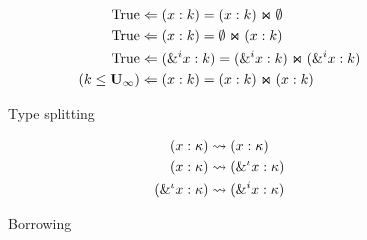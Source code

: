 \begin{figure*}[!h]
  \centering
  \begin{minipage}{0.45\linewidth}
    \begin{align*}
      \tsplit{\Ctrue&}{\bvar{x}{k}}{\bvar{x}{k}}{\Cempty}\\
      \tsplit{\Ctrue&}{\bvar{x}{k}}{\Cempty}{\bvar{x}{k}}\\
      \tsplit{\Ctrue&}{\bvar{\borrow[i]{x}}{k}}
                      {\bvar{\borrow[i]{x}}{k}}{\bvar{\borrow[i]{x}}{k}}\\
      \tsplit{\Cleq{k}{\kun_\infty}&}{\bvar{x}{k}}{\bvar{x}{k}}{\bvar{x}{k}}
    \end{align*}
    \caption{Type splitting}
    \label{typesplit}
  \end{minipage}\quad
  \begin{minipage}{0.45\linewidth}
    \begin{align*}
      \tregion{\bvar{x}{\kvar}&}{\bvar{x}{\kvar}}\\
      \tregion{\bvar{x}{\kvar}&}{\bvar{\borrow{x}}{\kvar}}\\
      \tregion{\bvar{\borrow{x}}{\kvar}&}{\bvar{\borrow[i]{x}}{\kvar}}
    \end{align*}
    \caption{Borrowing}
    \label{typesplit}
  \end{minipage}
\end{figure*}

